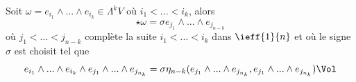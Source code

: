 \begin{pro}
Soit $\omega = e_{i_1}\wedge ... \wedge e_{i_k} \in \Lambda^kV$ où $i_1 < ... < i_k$, alors 
$$\star \omega = \sigma e_{j_1} \wedge ... \wedge e_{j_{n-k}}$$
où $j_1 < ... < j_{n-k}$ complète la suite $i_1 < ... < i_k$ dans $\ieff{1}{n}$ et où le signe $\sigma$ est choisit tel que 
$$e_{i_1} \wedge ... \wedge e_{i_k} \wedge e_{j_1} \wedge ... \wedge e_{j_{n_k}} = \sigma \eta_{n-k}(e_{j_1} \wedge ... \wedge e_{j_{n_k}}, e_{j_1} \wedge ... \wedge e_{j_{n_k}})\Vol $$ 
\end{pro}